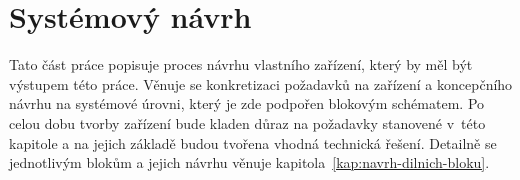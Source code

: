 \chapter{Systémový návrh}

Tato část práce popisuje proces návrhu vlastního zařízení, který by měl být výstupem této práce. Věnuje se konkretizaci požadavků na zařízení a koncepčního návrhu na systémové úrovni, který je zde podpořen blokovým schématem. Po celou dobu tvorby zařízení bude kladen důraz na požadavky stanovené v~této kapitole a na jejich základě budou tvořena vhodná technická řešení.  Detailně se jednotlivým blokům a jejich návrhu věnuje kapitola~\ref{kap:navrh-dilnich-bloku}.













